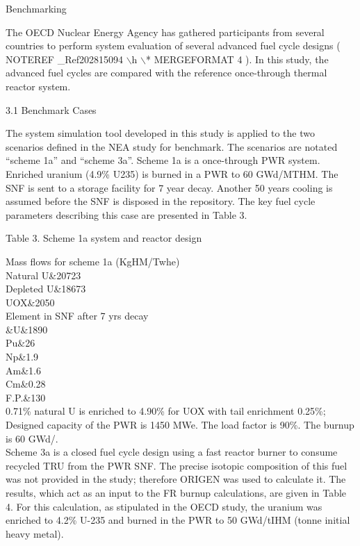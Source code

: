 Benchmarking

The OECD Nuclear Energy Agency has gathered participants from several
countries to perform system evaluation of several advanced fuel cycle
designs (  NOTEREF \_Ref202815094 $\backslash$h  $\backslash$*
MERGEFORMAT  4 ). In this study, the advanced fuel cycles are compared
with the reference once-through thermal reactor system.

3.1 Benchmark Cases

The system simulation tool developed in this study is applied to the two
scenarios defined in the NEA study for benchmark. The scenarios are
notated ``scheme 1a'' and ``scheme 3a''.  Scheme 1a is a once-through
PWR system.  Enriched uranium (4.9\% U235) is burned in a PWR to 60
GWd/MTHM.  The SNF is sent to a storage facility for 7 year decay.
Another 50 years cooling is assumed before the SNF is disposed in the
repository.  The key fuel cycle parameters describing this case are
presented in Table 3.

Table 3. Scheme 1a system and reactor design

Mass flows for scheme 1a (KgHM/Twhe)\\

Natural U&20723\\

Depleted U&18673\\

UOX&2050\\

Element in SNF after 7 yrs decay\\

&U&1890\\

Pu&26\\

Np&1.9\\

Am&1.6\\

Cm&0.28\\

F.P.&130\\

0.71\% natural U is enriched to 4.90\% for UOX with tail enrichment
0.25\%; Designed capacity of the PWR is 1450 MWe. The load factor is
90\%. The burnup is 60 GWd/.\\



	Scheme 3a is a closed fuel cycle design using a fast reactor burner to
consume recycled TRU from the PWR SNF.  The precise isotopic composition
of this fuel was not provided in the study; therefore ORIGEN was used to
calculate it.  The results, which act as an input to the FR burnup
calculations, are given in Table 4.  For this calculation, as stipulated
in the OECD study, the uranium was enriched to 4.2\% U-235 and burned in
the PWR to 50 GWd/tIHM (tonne initial heavy metal). 

